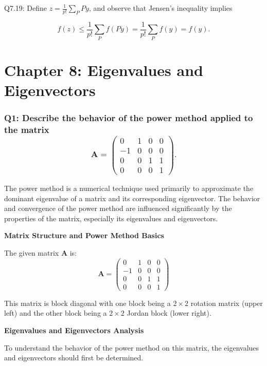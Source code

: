 \documentclass[8pt]{article}
\begin{document}
{{Q7.19: Define \( z = \frac{1}{p!} \sum_P Py \), and observe that Jensen’s inequality implies

\[
f(z) \leq \frac{1}{p!} \sum_P f(Py) = \frac{1}{p!} \sum_P f(y) = f(y).
\]


\newpage
\section*{Chapter 8: Eigenvalues and Eigenvectors}

\subsubsection*{Q1: Describe the behavior of the power method applied to the matrix
\[ 
\mathbf{A} = 
\begin{pmatrix}
0 & 1 & 0 & 0 \\
-1 & 0 & 0 & 0 \\
0 & 0 & 1 & 1 \\
0 & 0 & 0 & 1 
\end{pmatrix}. 
\]}

The power method is a numerical technique used primarily to approximate the dominant eigenvalue of a matrix and its corresponding eigenvector. The behavior and convergence of the power method are influenced significantly by the properties of the matrix, especially its eigenvalues and eigenvectors.

\textbf{Matrix Structure and Power Method Basics}

The given matrix \(\mathbf{A}\) is:
\[
\mathbf{A} = 
\begin{pmatrix}
0 & 1 & 0 & 0 \\
-1 & 0 & 0 & 0 \\
0 & 0 & 1 & 1 \\
0 & 0 & 0 & 1 
\end{pmatrix}
\]

This matrix is block diagonal with one block being a \(2 \times 2\) rotation matrix (upper left) and the other block being a \(2 \times 2\) Jordan block (lower right).

\textbf{Eigenvalues and Eigenvectors Analysis}

To understand the behavior of the power method on this matrix, the eigenvalues and eigenvectors should first be determined. 

}}
\end{document}
